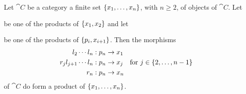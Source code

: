 \begin{proposition}\label{proposition:FiniteProdLeftCons}
Let \(\cat C\) be a category a finite set \(\left\{x_1, \dots{}, x_n\right\}\), with \(n \ge 2\), of objects of \(\cat C\). Let
be one of the products of \(\left\{x_1, x_2\right\}\) and let
be one of the products of \(\left\{p_i, x_{i+1}\right\}\).
%
%
Then the morphisms
\[\begin{aligned}
l_2 \cdots{} l_n &: p_n \to x_1 \\
r_j l_{j+1} \cdots{} l_n &: p_n \to x_j \quad \text{for } j \in \left\{2, \dots{}, n-1\right\} \\
r_n &: p_n \to x_n
\end{aligned}\]
of \(\cat C\) do form a product of \(\left\{x_1, \dots{}, x_n\right\}\).
\end{proposition}

